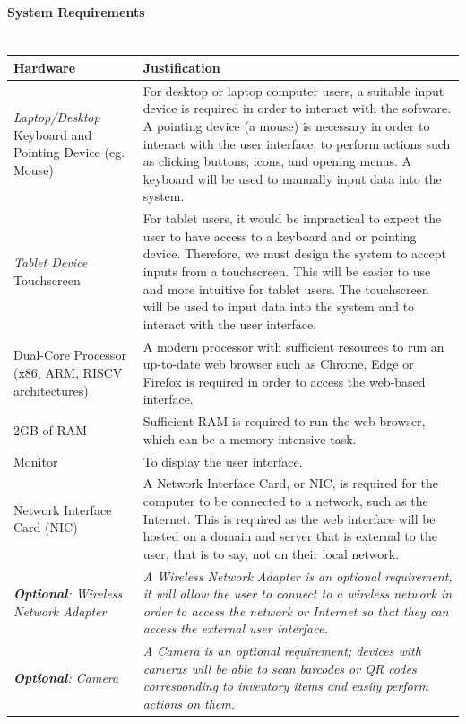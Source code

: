 \documentclass{article}
\begin{document}
\paragraph{System Requirements\\\\}

\begin{tabular}{ |p{}|p{}| }
    \hline
    \textbf{Hardware} & \textbf{Justification}\\
    \hline
    \textit{Laptop/Desktop}\newline
    Keyboard and Pointing Device (eg. Mouse) &
    For desktop or laptop computer users, a suitable input device is required in order to interact with the software.\newline
    A pointing device (a mouse) is necessary in order to interact with the user interface, to perform actions such as clicking buttons, icons, and opening menus.\newline
    A keyboard will be used to manually input data into the system.\\
    \hline
    \textit{Tablet Device}\newline
    Touchscreen & For tablet users, it would be impractical to expect the user to have access to a keyboard and or pointing device. Therefore, we must design the system to accept inputs from a touchscreen.\newline
    This will be easier to use and more intuitive for tablet users. \newline
    The touchscreen will be used to input data into the system and to interact with the user interface. \\
    \hline
    Dual-Core Processor
    \newline(x86, ARM, RISCV architectures) &
    A modern processor with sufficient resources to run an up-to-date web browser such as Chrome, Edge or Firefox is required in order to access the web-based interface.\\
    \hline
    2GB of RAM & Sufficient RAM is required to run the web browser, which can be a memory intensive task.\\
    \hline
    Monitor & To display the user interface. \\
    \hline
    Network Interface Card (NIC) & A Network Interface Card, or NIC, is required for the computer to be connected to a network, such as the Internet. This is required as the web interface will be hosted on a domain and server that is external to the user, that is to say, not on their local network. \\
    \hline
    \textit{\textbf{Optional}: Wireless Network Adapter} & \textit{A Wireless Network Adapter is an optional requirement, it will allow the user to connect to a wireless network in order to access the network or Internet so that they can access the external user interface.} \\
    \hline
    \textit{\textbf{Optional}: Camera} & \textit{A Camera is an optional requirement; devices with cameras will be able to scan barcodes or QR codes corresponding to inventory items and easily perform actions on them.} \\
    \hline
\end{tabular}
\end{document}
